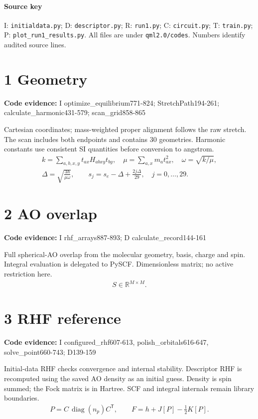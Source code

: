 \documentclass[10pt,a4paper]{article}
\newcommand{\stage}[2]{\section*{#1}\textbf{Code evidence:} #2\par}
\begin{document}
\paragraph{Source key} I: \texttt{initialdata.py}; D: \texttt{descriptor.py}; R: \texttt{run1.py}; C: \texttt{circuit.py}; T: \texttt{train.py}; \newline P: \texttt{plot\_run1\_results.py}. All files are under \texttt{qml2.0/codes}. Numbers identify audited source lines.
\clearpage
\par\noindent\begin{minipage}{\linewidth}
\stage{1 Geometry}{I optimize\_equilibrium771-824; StretchPath194-261; calculate\_harmonic431-579; scan\_grid858-865}
Cartesian coordinates; mass-weighted proper alignment follows the raw stretch. The scan includes both endpoints and contains 30 geometries. Harmonic constants use consistent SI quantities before conversion to angstrom.
\[
\begin{gathered}
k=\sum_{a,b,x,y}t_{ax}H_{abxy}t_{by},\quad \mu=\sum_{a,x}m_a t_{ax}^{2},\quad \omega=\sqrt{k/\mu},\\ \Delta=\sqrt{\frac{3\hbar}{\mu\omega}},\qquad s_j=s_e-\Delta+\frac{2j\Delta}{29},\quad j=0,\ldots,29.
\end{gathered}
\]
\end{minipage}\par\vspace{4pt}
\par\noindent\begin{minipage}{\linewidth}
\stage{2 AO overlap}{I rhf\_arrays887-893; D calculate\_record144-161}
Full spherical-AO overlap from the molecular geometry, basis, charge and spin. Integral evaluation is delegated to PySCF. Dimensionless matrix; no active restriction here.
\[
\begin{gathered}
S\in\mathbb R^{M\times M}.
\end{gathered}
\]
\end{minipage}\par\vspace{4pt}
\par\noindent\begin{minipage}{\linewidth}
\stage{3 RHF reference}{I configured\_rhf607-613, polish\_orbitals616-647, solve\_point660-743; D139-159}
Initial-data RHF checks convergence and internal stability. Descriptor RHF is recomputed using the saved AO density as an initial guess. Density is spin summed; the Fock matrix is in Hartree. SCF and integral internals remain library boundaries.
\[
\begin{gathered}
P=C\,\operatorname{diag}(n_p)C^{\mathsf T},\qquad F=h+J[P]-\tfrac12K[P].
\end{gathered}
\]
\end{minipage}\par\vspace{4pt}
\end{document}
